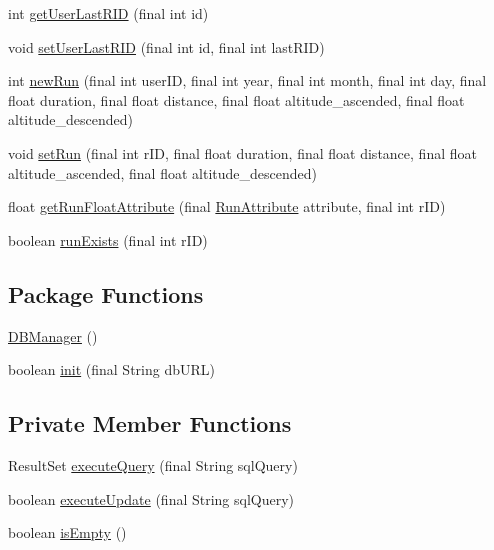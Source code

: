 \begin{DoxyCompactItemize}
\item 
int \mbox{\hyperlink{classcom_1_1activitytracker_1_1_d_b_manager_aab14c61b3f3a17bdea10cab1b5fd9337}{get\+User\+Last\+R\+ID}} (final int id)
\item 
void \mbox{\hyperlink{classcom_1_1activitytracker_1_1_d_b_manager_a93b7fc4c2d0083e125852d84f087a8d3}{set\+User\+Last\+R\+ID}} (final int id, final int last\+R\+ID)
\item 
int \mbox{\hyperlink{classcom_1_1activitytracker_1_1_d_b_manager_a05b742f583167f6ce00eb8415c43fc1c}{new\+Run}} (final int user\+ID, final int year, final int month, final int day, final float duration, final float distance, final float altitude\+\_\+ascended, final float altitude\+\_\+descended)
\item 
void \mbox{\hyperlink{classcom_1_1activitytracker_1_1_d_b_manager_a72282377a552ce4ce371abff02e312f2}{set\+Run}} (final int r\+ID, final float duration, final float distance, final float altitude\+\_\+ascended, final float altitude\+\_\+descended)
\item 
float \mbox{\hyperlink{classcom_1_1activitytracker_1_1_d_b_manager_a666452f1e5862f90c06b0beb9a9fcfdd}{get\+Run\+Float\+Attribute}} (final \mbox{\hyperlink{enumcom_1_1activitytracker_1_1_run_attribute}{Run\+Attribute}} attribute, final int r\+ID)
\item 
boolean \mbox{\hyperlink{classcom_1_1activitytracker_1_1_d_b_manager_a723ac1c573bacdd0b62894357bd65a9b}{run\+Exists}} (final int r\+ID)
\end{DoxyCompactItemize}
\subsection*{Package Functions}
\begin{DoxyCompactItemize}
\item 
\mbox{\hyperlink{classcom_1_1activitytracker_1_1_d_b_manager_ac1f558ef56fe02d74fe103a473a15bb5}{D\+B\+Manager}} ()
\item 
boolean \mbox{\hyperlink{classcom_1_1activitytracker_1_1_d_b_manager_a41df4600bb5901a26a4ea6a7108a70b9}{init}} (final String db\+U\+RL)
\end{DoxyCompactItemize}
\subsection*{Private Member Functions}
\begin{DoxyCompactItemize}
\item 
Result\+Set \mbox{\hyperlink{classcom_1_1activitytracker_1_1_d_b_manager_adef71a18dc05536d80e83311841e1953}{execute\+Query}} (final String sql\+Query)
\item 
boolean \mbox{\hyperlink{classcom_1_1activitytracker_1_1_d_b_manager_a382397e2bdf309901d1c80ff66be69b7}{execute\+Update}} (final String sql\+Query)
\item 
boolean \mbox{\hyperlink{classcom_1_1activitytracker_1_1_d_b_manager_af9ab112f840e3c803b6b28a2f1a15215}{is\+Empty}} ()
\end{DoxyCompactItemize}
